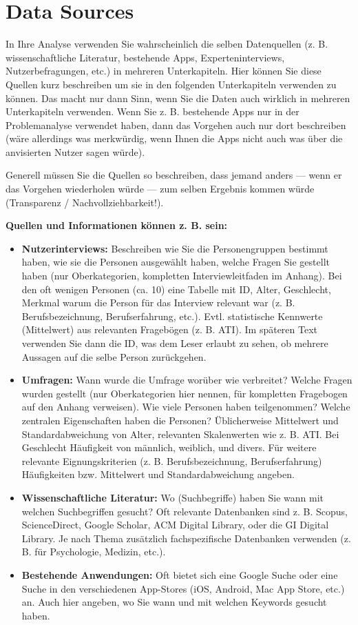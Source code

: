 \documentclass[11pt,a4paper,english]{scrreprt}
\newenvironment{comment}
  {\par\medskip
   \begingroup\color{olive}%
   }
 {\endgroup
  \medskip}
\begin{document}
\section{Data Sources}
\begin{comment}
In Ihre Analyse verwenden Sie wahrscheinlich die selben Datenquellen (z. B. wissenschaftliche Literatur, bestehende Apps, Experteninterviews, Nutzerbefragungen, etc.) in mehreren Unterkapiteln. Hier können Sie diese Quellen kurz beschreiben um sie in den folgenden Unterkapiteln verwenden zu können. Das macht nur dann Sinn, wenn Sie die Daten auch wirklich in mehreren Unterkapiteln verwenden. Wenn Sie z. B. bestehende Apps nur in der Problemanalyse verwendet haben, dann das Vorgehen auch nur dort beschreiben (wäre allerdings was merkwürdig, wenn Ihnen die Apps nicht auch was über die anvisierten Nutzer sagen würde).

Generell müssen Sie die Quellen so beschreiben, dass jemand anders — wenn er das Vorgehen wiederholen würde — zum selben Ergebnis kommen würde (Transparenz / Nachvollziehbarkeit!).

\textbf{Quellen und Informationen können z. B. sein:}

\begin{itemize}
    \item \textbf{Nutzerinterviews:} Beschreiben wie Sie die Personengruppen bestimmt haben, wie sie die Personen ausgewählt haben, welche Fragen Sie gestellt haben (nur Oberkategorien, kompletten Interviewleitfaden im Anhang). Bei den oft wenigen Personen (ca. 10) eine Tabelle mit ID, Alter, Geschlecht, Merkmal warum die Person für das Interview relevant war (z. B. Berufsbezeichnung, Berufserfahrung, etc.). Evtl. statistische Kennwerte (Mittelwert) aus relevanten Fragebögen (z. B. ATI). Im späteren Text verwenden Sie dann die ID, was dem Leser erlaubt zu sehen, ob mehrere Aussagen auf die selbe Person zurückgehen.
    \item \textbf{Umfragen:} Wann wurde die Umfrage worüber wie verbreitet? Welche Fragen wurden gestellt (nur Oberkategorien hier nennen, für kompletten Fragebogen auf den Anhang verweisen). Wie viele Personen haben teilgenommen? Welche zentralen Eigenschaften haben die Personen? Üblicherweise Mittelwert und Standardabweichung von Alter, relevanten Skalenwerten wie z. B. ATI. Bei Geschlecht Häufigkeit von männlich, weiblich, und divers. Für weitere relevante Eignungskriterien (z. B. Berufsbezeichnung, Berufserfahrung) Häufigkeiten bzw. Mittelwert und Standardabweichung angeben.
    \item \textbf{Wissenschaftliche Literatur:} Wo (Suchbegriffe) haben Sie wann mit welchen Suchbegriffen gesucht? Oft relevante Datenbanken sind z. B. Scopus, ScienceDirect, Google Scholar, ACM Digital Library, oder die GI Digital Library. Je nach Thema zusätzlich fachspezifische Datenbanken verwenden (z. B. für Psychologie, Medizin, etc.).
    \item \textbf{Bestehende Anwendungen:} Oft bietet sich eine Google Suche oder eine Suche in den verschiedenen App-Stores (iOS, Android, Mac App Store, etc.) an. Auch hier angeben, wo Sie wann und mit welchen Keywords gesucht haben.
\end{itemize}


\end{comment}
\end{document}
